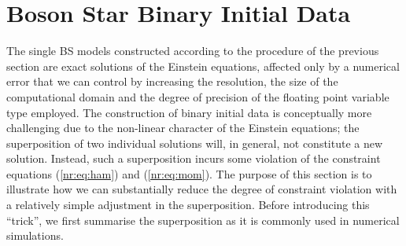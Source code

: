 \section{Boson Star Binary Initial Data}
\label{mal:sec:superposition}
%
The single BS models constructed according to the procedure of the
previous section are exact solutions of the Einstein equations, affected
only by a numerical error that we can control by increasing the resolution,
the size of the computational domain and the degree of precision of the floating
point variable type employed. The construction of binary initial data is
conceptually more challenging due to the non-linear character of the
Einstein equations; the superposition of two individual solutions will,
in general, not constitute a new solution. Instead, such a superposition
incurs some violation of the constraint equations (\ref{nr:eq:ham}) and
(\ref{nr:eq:mom}). The purpose of this section is to illustrate
how we can substantially reduce the degree of constraint
violation with a relatively simple adjustment in the
superposition. Before introducing this ``trick'', we first
summarise the superposition as it is commonly used in numerical
simulations.

